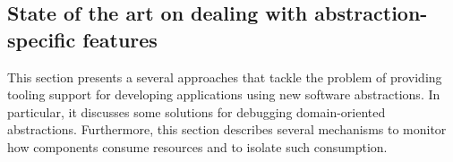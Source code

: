 %
%
%
%
%

\subsection{State of the art on dealing with abstraction-specific features}

This section presents a several approaches that tackle the problem of providing tooling support for developing applications using new software abstractions.
In particular, it discusses some solutions for debugging domain-oriented abstractions.
Furthermore, this section describes several mechanisms to monitor how components consume resources and to isolate such consumption.

